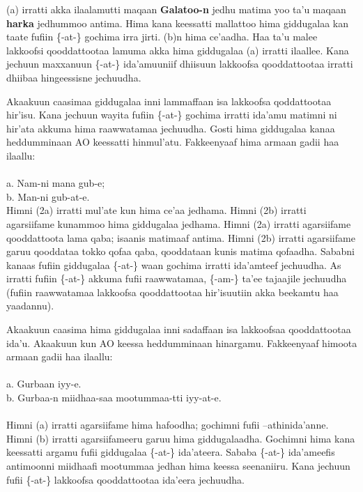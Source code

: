 \documentclass[11pt,b5paper]{book}
\begin{document}
(a) irratti akka ilaalamutti maqaan \textbf{Galatoo-n} jedhu matima yoo ta’u maqaan \textbf{harka} jedhummoo antima. Hima kana keessatti mallattoo hima giddugalaa kan taate fufiin \{-at-\} gochima irra
jirti. (b)n hima ce’aadha. Haa ta’u malee lakkoofsi qooddattootaa lamuma akka hima giddugalaa (a) irratti ilaallee. Kana jechuun maxxanuun \{-at-\} ida’amuuniif dhiisuun lakkoofsa
qooddattootaa irratti dhiibaa hingeessisne jechuudha.

Akaakuun caasimaa giddugalaa inni lammaffaan isa lakkoofsa qoddattootaa hir’isu. Kana jechuun wayita fufiin \{-at-\} gochima irratti ida’amu matimni ni hir’ata akkuma hima raawwatamaa
jechuudha. Gosti hima giddugalaa kanaa heddumminaan AO keessatti hinmul’atu. Fakkeenyaaf hima armaan gadii haa ilaallu: \\
\\
a. Nam-ni mana gub-e; \\
b. Man-ni gub-at-e.\\

Himni (2a) irratti mul’ate kun hima ce’aa jedhama. Himni (2b) irratti agarsiifame kunammoo hima giddugalaa jedhama. Himni (2a) irratti agarsiifame qooddattoota lama qaba; isaanis
matimaaf antima. Himni (2b) irratti agarsiifame garuu qooddataa tokko qofaa qaba, qooddataan kunis matima qofaadha. Sababni kanaas fufiin giddugalaa \{-at-\} waan gochima irratti ida’amteef jechuudha. As irratti fufiin \{-at-\} akkuma fufii raawwatamaa, \{-am-\} ta’ee tajaajile jechuudha (fufiin
raawwatamaa lakkoofsa qooddattootaa hir’isuutiin akka beekamtu haa yaadannu).

Akaakuun caasima hima giddugalaa inni sadaffaan isa lakkoofsaa qooddattootaa ida’u. Akaakuun kun AO keessa heddumminaan hinargamu. Fakkeenyaaf himoota armaan gadii haa ilaallu: \\
\\
a. Gurbaan iyy-e.\\
b. Gurbaa-n miidhaa-saa mootummaa-tti iyy-at-e.\\
\\
Himni (a) irratti agarsiifame hima hafoodha; gochimni fufii –athinida’anne. Himni (b) irratti agarsiifameeru garuu hima giddugalaadha. Gochimni hima kana keessatti argamu fufii
giddugalaa \{-at-\} ida’ateera. Sababa \{-at-\} ida’ameefis antimoonni miidhaafi mootummaa jedhan hima keessa seenaniiru. Kana jechuun fufii \{-at-\} lakkoofsa qooddattootaa ida’eera jechuudha.
\end{document}
